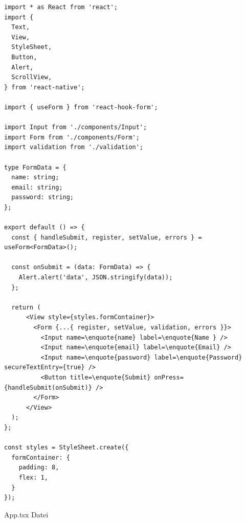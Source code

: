  

\begin{listing}[H]
	\label{lst:quelltext9}

    \begin{verbatim}
import * as React from 'react';
import {
  Text,
  View,
  StyleSheet,
  Button,
  Alert,
  ScrollView,
} from 'react-native';

import { useForm } from 'react-hook-form';

import Input from './components/Input';
import Form from './components/Form';
import validation from './validation';

type FormData = {
  name: string;
  email: string;
  password: string;
};

export default () => {
  const { handleSubmit, register, setValue, errors } = useForm<FormData>();

  const onSubmit = (data: FormData) => {
	Alert.alert('data', JSON.stringify(data));
  };

  return (
	  <View style={styles.formContainer}>
		<Form {...{ register, setValue, validation, errors }}>
		  <Input name=\enquote{name} label=\enquote{Name } />
		  <Input name=\enquote{email} label=\enquote{Email} />
		  <Input name=\enquote{password} label=\enquote{Password} secureTextEntry={true} />
		  <Button title=\enquote{Submit} onPress={handleSubmit(onSubmit)} />
		</Form>
	  </View>
  );
};

const styles = StyleSheet.create({
  formContainer: {
	padding: 8,
	flex: 1,
  }
});		
\end{verbatim}


\caption[App.tsx]{App.tsx Datei}
\end{listing}
